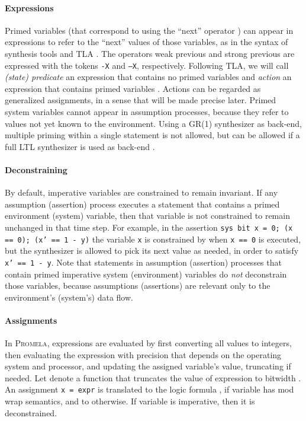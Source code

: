 \documentclass[copyright]{eptcs}
\begin{document}
\paragraph{Expressions}
\label{sec:expressions}

Primed variables (that correspond to using the “next” operator )
can appear in expressions to refer to the “next” values of those variables, as in the syntax of synthesis tools and \textsc{TLA} \cite{Lamport94tpls}.
The operators weak previous  and strong previous  are expressed with the tokens \texttt{-X} and \texttt{--X}, respectively.
Following \textsc{TLA}, we will call {\em (state) predicate} an expression that contains no primed variables and {\em action} an expression that contains primed variables \cite{Lamport94tpls}.
Actions can be regarded as generalized assignments, in a sense that will be made precise later.
Primed system variables cannot appear in assumption processes, because they refer to values not yet known to the environment.
Using a GR(1) synthesizer as back-end, multiple priming within a single statement is not allowed, but can be allowed if a full LTL synthesizer is used as back-end \cite{Jobstmann06fmcad,Finkbeiner13sttt}.


\paragraph{Deconstraining}

By default, imperative variables are constrained to remain invariant.
If any assumption (assertion) process executes a statement that contains a primed environment (system) variable, then that variable is not constrained to remain unchanged in that time step.
For example, in the assertion \texttt{sys bit x = 0; (x == 0); (x' == 1 - y)} the variable \texttt{x} is constrained by  when \texttt{x == 0} is executed, but the synthesizer is allowed to pick its next value as needed, in order to satisfy \texttt{x' == 1 - y}.
Note that statements in assumption (assertion) processes that contain primed imperative system (environment) variables do {\em not} deconstrain those variables, because assumptions (assertions) are relevant only to the environment's (system's) data flow.


\paragraph{Assignments}

In \textsc{Promela}, expressions are evaluated by first converting all values to integers, then evaluating the expression with precision that depends on the operating system and processor, and updating the assigned variable's value, truncating if needed.
Let  denote a function that truncates the value of expression  to bitwidth .
An assignment \verb+x = expr+ is translated to the logic formula , if variable  has mod wrap semantics, and to  otherwise.
If variable  is imperative, then it is deconstrained.
\end{document}

